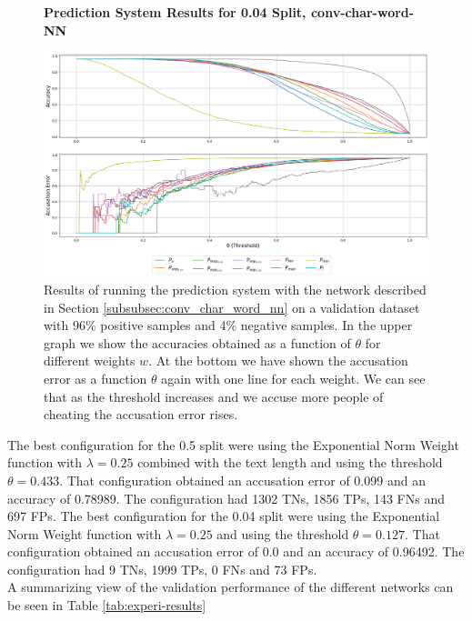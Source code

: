 \begin{figure}
    \centering
    \textbf{Prediction System Results for 0.04 Split, \glsdesc{conv-char-word-NN}}\par\medskip
    \includegraphics[scale=0.33]{./pictures/experiments/conv_char_word_nn/prediction_system_04.png}
    \caption{Results of running the prediction system with the network described
        in Section \ref{subsubsec:conv_char_word_nn} on a validation dataset
        with 96\% positive samples and 4\% negative samples. In the upper graph
        we show the accuracies obtained as a function of $\theta$ for different
        weights $w$. At the bottom we have shown the accusation error as a
        function $\theta$ again with one line for each weight. We can see that
        as the threshold increases and we accuse more people of cheating the
        accusation error rises.}
    \label{fig:conv-char-word-NN-pred-4}
\end{figure}

The best configuration for the 0.5 split were using the Exponential Norm Weight
function with $\lambda = 0.25$ combined with the text length and using the
threshold $\theta = 0.433$. That configuration obtained an accusation error of
0.099 and an accuracy of 0.78989. The configuration had 1302 \gls{TN}s, 1856
\gls{TP}s, 143 \gls{FN}s and 697 \gls{FP}s. The best configuration for the 0.04
split were using the Exponential Norm Weight function with $\lambda = 0.25$ and
using the threshold $\theta = 0.127$. That configuration obtained an accusation
error of 0.0 and an accuracy of 0.96492. The configuration had 9 \gls{TN}s, 1999
\gls{TP}s, 0 \gls{FN}s and 73 \gls{FP}s.\\

A summarizing view of the validation performance of the different networks can be seen
in Table \ref{tab:experi-results}

